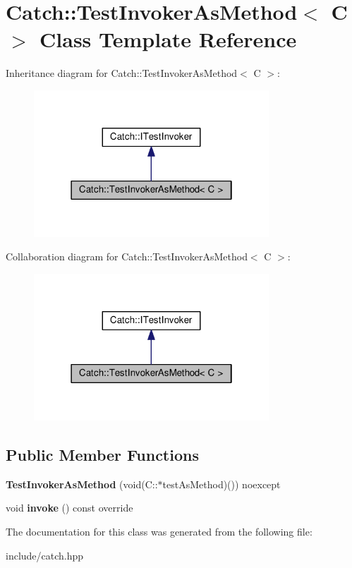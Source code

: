 \hypertarget{classCatch_1_1TestInvokerAsMethod}{}\section{Catch\+:\+:Test\+Invoker\+As\+Method$<$ C $>$ Class Template Reference}
\label{classCatch_1_1TestInvokerAsMethod}


Inheritance diagram for Catch\+:\+:Test\+Invoker\+As\+Method$<$ C $>$\+:\nopagebreak
\begin{figure}[H]
\begin{center}
\leavevmode
\includegraphics[width=250pt]{classCatch_1_1TestInvokerAsMethod__inherit__graph}
\end{center}
\end{figure}


Collaboration diagram for Catch\+:\+:Test\+Invoker\+As\+Method$<$ C $>$\+:\nopagebreak
\begin{figure}[H]
\begin{center}
\leavevmode
\includegraphics[width=250pt]{classCatch_1_1TestInvokerAsMethod__coll__graph}
\end{center}
\end{figure}
\subsection*{Public Member Functions}
\begin{DoxyCompactItemize}
\item 
{\bfseries Test\+Invoker\+As\+Method} (void(C\+::$\ast$test\+As\+Method)()) noexcept\hypertarget{classCatch_1_1TestInvokerAsMethod_a119c4bdbbdd95c42859c18541987a1a4}{}\label{classCatch_1_1TestInvokerAsMethod_a119c4bdbbdd95c42859c18541987a1a4}

\item 
void {\bfseries invoke} () const override\hypertarget{classCatch_1_1TestInvokerAsMethod_a8115a06efe273f4112ec0b5452c1b5f2}{}\label{classCatch_1_1TestInvokerAsMethod_a8115a06efe273f4112ec0b5452c1b5f2}

\end{DoxyCompactItemize}


The documentation for this class was generated from the following file\+:\begin{DoxyCompactItemize}
\item 
include/catch.\+hpp\end{DoxyCompactItemize}
